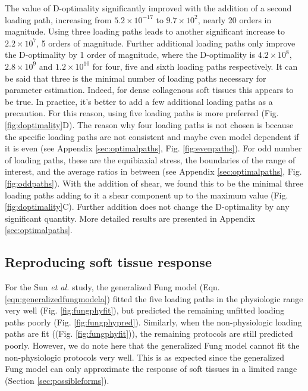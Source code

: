     
    The value of D-optimality significantly improved with the addition of a second loading path, increasing from $5.2 \times 10^{-17}$ to $9.7 \times 10^2$, nearly 20 orders in magnitude. Using three loading paths leads to another significant increase to $2.2 \times 10^7$, 5 orders of magnitude. Further additional loading paths only improve the D-optimality by 1 order of magnitude, where the D-optimality is $4.2 \times 10^8$, $2.8 \times 10^9$ and $1.2 \times 10^{10}$ for four, five and sixth loading paths respectively. It can be said that three is the minimal number of loading paths necessary for parameter estimation. Indeed, for dense collagenous soft tissues this appears to be true. In practice, it's better to add a few additional loading paths as a precaution. For this reason, using five loading paths is more preferred (Fig. \ref{fig:doptimality}D). The reason why four loading paths is not chosen is because the specific loading paths are not consistent and maybe even model dependent if it is even (see Appendix \ref{sec:optimalpaths}, Fig. \ref{fig:evenpaths}). For odd number of loading paths, these are the equibiaxial stress, the boundaries of the range of interest, and the average ratios in between (see Appendix \ref{sec:optimalpaths}, Fig. \ref{fig:oddpaths}). With the addition of shear, we found this to be the minimal three loading paths adding to it a shear component up to the maximum value (Fig. \ref{fig:doptimality}C). Further addition does not change the D-optimality by any significant quantity. More detailed results are presented in Appendix \ref{sec:optimalpaths}.
    
    
  


   

\subsection{Reproducing soft tissue response}

	For the Sun \textit{et al.} \cite{sun_biaxial_2003} study, the generalized Fung model (Eqn. \ref{eqn:generalizedfungmodela}) fitted the five loading paths in the physiologic range very well (Fig. \ref{fig:fungphyfit}), but predicted the remaining unfitted loading paths poorly (Fig. \ref{fig:fungphypred}). Similarly, when the non-physiologic loading paths are fit ((Fig. \ref{fig:fungphyfit})), the remaining protocols are still predicted poorly. However, we do note here that the generalized Fung model cannot fit the non-physiologic protocols very well. This is as expected since the generalized Fung model can only approximate the response of soft tissues in a limited range (Section \ref{sec:possibleforms}). 

